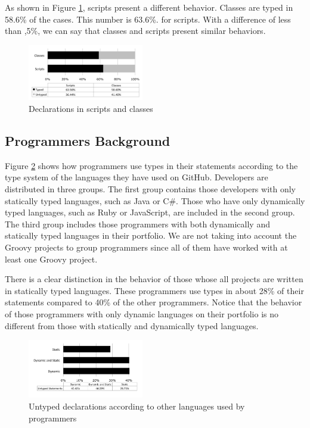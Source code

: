 \documentclass[preprint]{sigplanconf}
\begin{document}
As shown in Figure \ref{fig:scripts}, scripts present a different behavior.
Classes are typed in 58.6\% of the cases. This number is 63.6\%. for scripts.
With a difference of less than ,5\%, we can say that classes and scripts present similar behaviors.

\begin{figure}[ht]
\centering \includegraphics[width=0.45\textwidth]{scripts} 
\caption{Declarations in scripts and classes}
\label{fig:scripts} 
\end{figure}


\subsection{Programmers Background\label{res-background}}

Figure \ref{fig:untyped_background} shows how programmers use types in their statements according to the type system of the languages they have used on GitHub.
Developers are distributed in three groups.
The first group contains those developers with only statically typed languages, such as Java or C\#.
Those who have only dynamically typed languages, such as Ruby or JavaScript, are included in the second group.
The third group includes those programmers with both dynamically and statically typed languages in their portfolio.
We are not taking into account the Groovy projects to group programmers since all of them have worked with at least one Groovy project.

There is a clear distinction in the behavior of those whose all projects are written in statically typed languages.
These programmers use types in about 28\% of their statements compared to 40\% of the other programmers.
Notice that the behavior of those programmers with only dynamic languages on their portfolio is no different from those with statically and dynamically typed languages.

\begin{figure}[ht]
\centering \includegraphics[width=0.45\textwidth]{untyped_background} 
\caption{Untyped declarations according to other languages used by programmers}
\label{fig:untyped_background} 
\end{figure}
\end{document}
